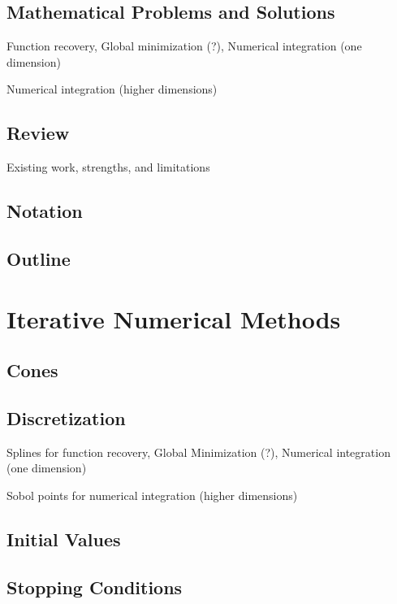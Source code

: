 \documentclass[acmtoms]{doc_acmtrans2m}
\begin{document}
\subsection{Mathematical Problems and Solutions} \label{sec:prob}
 

Function recovery, Global minimization (?), Numerical integration (one dimension)

Numerical integration (higher dimensions)

\subsection{Review} \label{sec:lit}
 

Existing work, strengths, and limitations

\subsection{Notation} \label{sec:not}

\subsection{Outline} \label{sec:lit}

\section{Iterative Numerical Methods} 
\label{sec:meth}
 
\subsection{Cones} \label{sec:cones}


\subsection{Discretization} \label{sec:dis}
Splines for function recovery, Global Minimization (?), Numerical integration (one dimension)
 
Sobol points for numerical integration (higher dimensions)

\subsection{Initial Values}

\subsection{Stopping Conditions}
\end{document}
